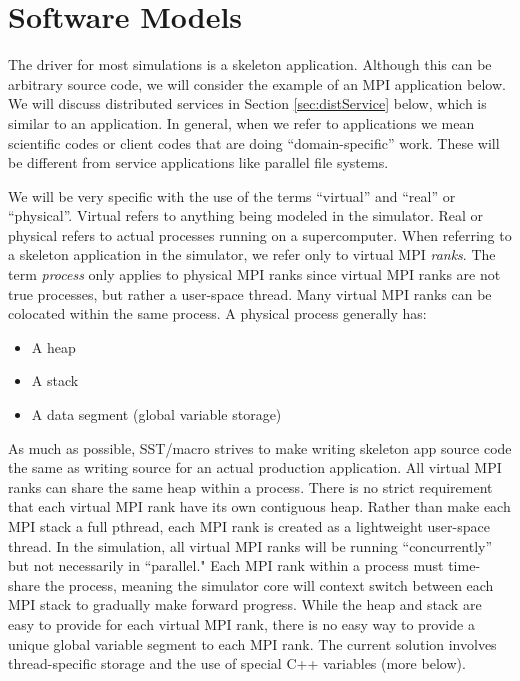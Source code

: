 
\chapter{Software Models}
\label{chapter:software}

The driver for most simulations is a skeleton application.
Although this can be arbitrary source code, we will consider the example of an MPI application below.
We will discuss distributed services in Section \ref{sec:distService} below, which is similar to an application.  In general, when we refer to applications we mean scientific codes or client codes that are doing ``domain-specific'' work.  These will be different from service applications like parallel file systems.

We will be very specific with the use of the terms ``virtual'' and ``real'' or ``physical''.  
Virtual refers to anything being modeled in the simulator. 
Real or physical refers to actual processes running on a supercomputer.
When referring to a skeleton application in the simulator, we refer only to virtual MPI \emph{ranks}.
The term \emph{process} only applies to physical MPI ranks since virtual MPI ranks are not true processes, 
but rather a user-space thread.  
Many virtual MPI ranks can be colocated within the same process. A physical process generally has:
\begin{itemize}
\item A heap
\item A stack
\item A data segment (global variable storage)
\end{itemize}

As much as possible, SST/macro strives to make writing skeleton app source code the same as writing source for an actual production application.
All virtual MPI ranks can share the same heap within a process.
There is no strict requirement that each virtual MPI rank have its own contiguous heap.
Rather than make each MPI stack a full pthread, each MPI rank is created as a lightweight user-space thread.
In the simulation, all virtual MPI ranks will be running ``concurrently'' but not necessarily in ``parallel."
Each MPI rank within a process must time-share the process,
meaning the simulator core will context switch between each MPI stack to gradually make forward progress.
While the heap and stack are easy to provide for each virtual MPI rank,
there is no easy way to provide a unique global variable segment to each MPI rank.
The current solution involves thread-specific storage and the use of special C++ variables (more below).

